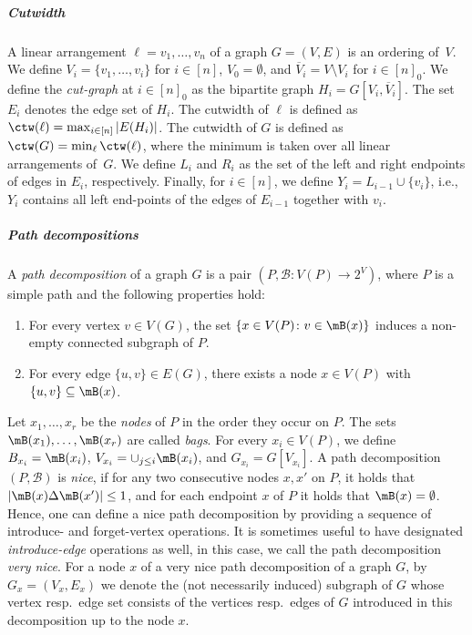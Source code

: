 \documentclass[a4paper,UKenglish,cleveref, autoref, thm-restate]{lipics-v2021}
\begin{document}
\subparagraph{Cutwidth}
A linear arrangement $\ell= v_1,\dots, v_n$ of a graph $G=(V,E)$ is an ordering of~$V$. We define $V_i = \{v_1,\dots, v_i\}$ for $i\in[n]$, $V_0=\emptyset$, and $\overline{V}_i = V\setminus V_i$ for $i \in [n]_0$. We define the \emph{cut-graph} at $i \in [n]_0$ as the bipartite graph $H_i = G[V_i, \overline{V}_i]$. 
The set $E_i$ denotes the edge set of $H_i$.
The cutwidth of $\ell$ is defined as $\ctw(\ell) = \max_{i\in [n]} |E(H_i)|$. The cutwidth of $G$ is defined as $\ctw(G) = \min_{\ell} \ctw(\ell)$, where the minimum is taken over all linear arrangements of~$G$. 
We define $L_i$ and $R_i$ as the set of the left and right endpoints of edges in $E_i$, respectively. 
Finally, for $i \in [n]$, we define $Y_i = L_{i-1}\cup \{v_i\}$, i.e., $Y_i$ contains all left end-points of the edges of $E_{i-1}$ together with $v_i$.

\subparagraph{Path decompositions}
A \emph{path decomposition} of a graph $G$ is a pair $(P, \mathcal{B}:V(P)\rightarrow 2^V)$, where $P$ is a simple path and the following properties hold:
\begin{enumerate}
	\item For every vertex $v \in V(G)$, the set $\{x\in V(P)\colon v\in \mB(x)\}$ induces a non-empty connected subgraph of $P$.
	\item For every edge $\{u, v\} \in E(G)$, there exists a node $x \in V(P)$ with $\{u, v\} \subseteq \mB(x)$.
\end{enumerate}
Let $x_1,\dots, x_r$ be the \emph{nodes} of $P$ in the order they occur on $P$. 
The sets $\mB(x_1), \dots, \mB(x_r)$ are called \emph{bags}.
For every $x_i\in V(P)$, we define $B_{x_i} = \mB(x_i)$, $V_{x_i} = \cup_{j \leq i}\mB(x_i)$, and $G_{x_i} = G[V_{x_i}]$.
A path decomposition $(P, \mathcal{B})$ is \emph{nice}, if for any two consecutive nodes $x,x'$ on $P$, it holds that $|\mB(x)\Delta\mB(x')|\leq 1$, and for each endpoint $x$ of $P$ it holds that $\mB(x)=\emptyset$. Hence, one can define a nice path decomposition by providing a sequence of introduce- and forget-vertex operations. It is sometimes useful to have designated \emph{introduce-edge} operations as well, in this case, we call the path decomposition \emph{very nice}. For a node $x$ of a very nice path decomposition of a graph $G$, by $G_x = (V_x, E_x)$ we denote the (not necessarily induced) subgraph of $G$ whose vertex resp.\ edge set consists of the vertices resp.\ edges of $G$ introduced in this decomposition up to the node $x$.
\end{document}

